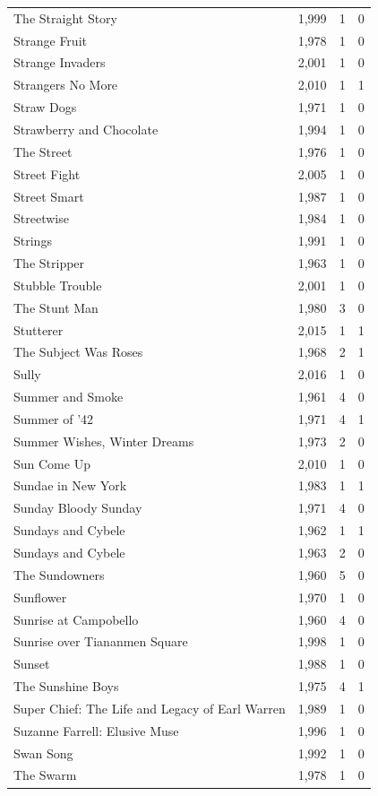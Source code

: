 \begin{tabular}{lrrr}
The Straight Story & 1,999 & 1 & 0 \\
Strange Fruit & 1,978 & 1 & 0 \\
Strange Invaders & 2,001 & 1 & 0 \\
Strangers No More & 2,010 & 1 & 1 \\
Straw Dogs & 1,971 & 1 & 0 \\
Strawberry and Chocolate & 1,994 & 1 & 0 \\
The Street & 1,976 & 1 & 0 \\
Street Fight & 2,005 & 1 & 0 \\
Street Smart & 1,987 & 1 & 0 \\
Streetwise & 1,984 & 1 & 0 \\
Strings & 1,991 & 1 & 0 \\
The Stripper & 1,963 & 1 & 0 \\
Stubble Trouble & 2,001 & 1 & 0 \\
The Stunt Man & 1,980 & 3 & 0 \\
Stutterer & 2,015 & 1 & 1 \\
The Subject Was Roses & 1,968 & 2 & 1 \\
Sully & 2,016 & 1 & 0 \\
Summer and Smoke & 1,961 & 4 & 0 \\
Summer of '42 & 1,971 & 4 & 1 \\
Summer Wishes, Winter Dreams & 1,973 & 2 & 0 \\
Sun Come Up & 2,010 & 1 & 0 \\
Sundae in New York & 1,983 & 1 & 1 \\
Sunday Bloody Sunday & 1,971 & 4 & 0 \\
Sundays and Cybele & 1,962 & 1 & 1 \\
Sundays and Cybele & 1,963 & 2 & 0 \\
The Sundowners & 1,960 & 5 & 0 \\
Sunflower & 1,970 & 1 & 0 \\
Sunrise at Campobello & 1,960 & 4 & 0 \\
Sunrise over Tiananmen Square & 1,998 & 1 & 0 \\
Sunset & 1,988 & 1 & 0 \\
The Sunshine Boys & 1,975 & 4 & 1 \\
Super Chief: The Life and Legacy of Earl Warren & 1,989 & 1 & 0 \\
Suzanne Farrell: Elusive Muse & 1,996 & 1 & 0 \\
Swan Song & 1,992 & 1 & 0 \\
The Swarm & 1,978 & 1 & 0 \\

\end{tabular}
